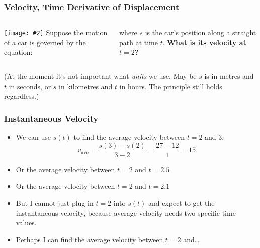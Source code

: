 \documentclass[12pt,compress,aspectratio=169]{beamer}
\newcommand{\pic}[2]{\texttt{[image: \#2]}}
\begin{document}
\begin{frame}
  \frametitle{Velocity, Time Derivative of Displacement}
  \begin{columns}
    \pic{1}{speedometer.jpg}
    Suppose the motion of a car is governed by the equation:

      \vspace{-.4in}{\Large
        \begin{displaymath}
          s(t)=3t^2
        \end{displaymath}
      }
      
      \vspace{-0.2in}where $s$ is the car's position along a straight path at
      time $t$. \textbf{What is its velocity at $t=2$?}
  \end{columns}
  
  \vspace{.2in}(At the moment it's not important what \emph{units} we use. May
  be $s$ is in metres and $t$ in seconds, or $s$ in kilometres and $t$ in hours.
  The principle still holds regardless.)
\end{frame}


\begin{frame}
  \frametitle{Instantaneous Velocity}
  \begin{itemize}
  \item We can use $s(t)$ to find the average velocity between $t=2$ and $3$:
    \begin{displaymath}
      v_\mathrm{ave}=\frac{s(3)-s(2)}{3-2}=\frac{27-12}{1}=15
    \end{displaymath}
  \item Or the average velocity between $t=2$ and $t=2.5$
  \item Or the average velocity between $t=2$ and $t=2.1$
  \item But I cannot just plug in $t=2$ into $s(t)$ and expect to get the
    instantaneous velocity, because average velocity needs two specific time
    values.
  \item Perhaps I can find the average velocity between $t=\num{2}$ and\ldots
  \end{itemize}
\end{frame}
\end{document}
